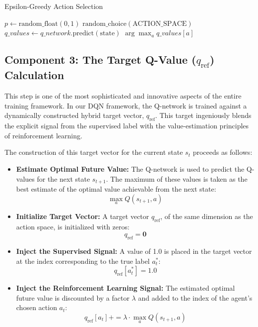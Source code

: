 \documentclass[12pt]{report}
\begin{document}
\begin{algorithm}[H]
\caption{Epsilon-Greedy Action Selection}
\label{alg:epsilon_greedy}
\begin{algorithmic}[1]
    \State $p \gets \text{random\_float}(0, 1)$
        \State \Return $\text{random\_choice}(\text{ACTION\_SPACE})$
    \Else
        \State $q\_values \gets q\_network.\text{predict}(\text{state})$
        \State \Return $\arg\max_a q\_values[a]$
    \EndIf
\EndFunction
\end{algorithmic}
\end{algorithm}

\subsection{Component 3: The Target Q-Value ($q_\text{ref}$) Calculation}

This step is one of the most sophisticated and innovative aspects of the entire training framework. In our DQN framework, the Q-network is trained against a dynamically constructed hybrid target vector, $q_\text{ref}$. This target ingeniously blends the explicit signal from the supervised label with the value-estimation principles of reinforcement learning.

The construction of this target vector for the current state $s_t$ proceeds as follows:

\begin{itemize}
    \item \textbf{Estimate Optimal Future Value:} The Q-network is used to predict the Q-values for the next state $s_{t+1}$. The maximum of these values is taken as the best estimate of the optimal value achievable from the next state:
    \[
    \max_a Q(s_{t+1}, a)
    \]
    
    \item \textbf{Initialize Target Vector:} A target vector $q_\text{ref}$, of the same dimension as the action space, is initialized with zeros:
    \[
    q_\text{ref} = \mathbf{0}
    \]

    \item \textbf{Inject the Supervised Signal:} A value of 1.0 is placed in the target vector at the index corresponding to the true label $a_t^*$:
    \[
    q_\text{ref}[a_t^*] = 1.0
    \]

    \item \textbf{Inject the Reinforcement Learning Signal:} The estimated optimal future value is discounted by a factor $\lambda$ and added to the index of the agent’s chosen action $a_t$:
    \[
    q_\text{ref}[a_t] += \lambda \cdot \max_a Q(s_{t+1}, a)
    \]
\end{itemize}
\end{document}
